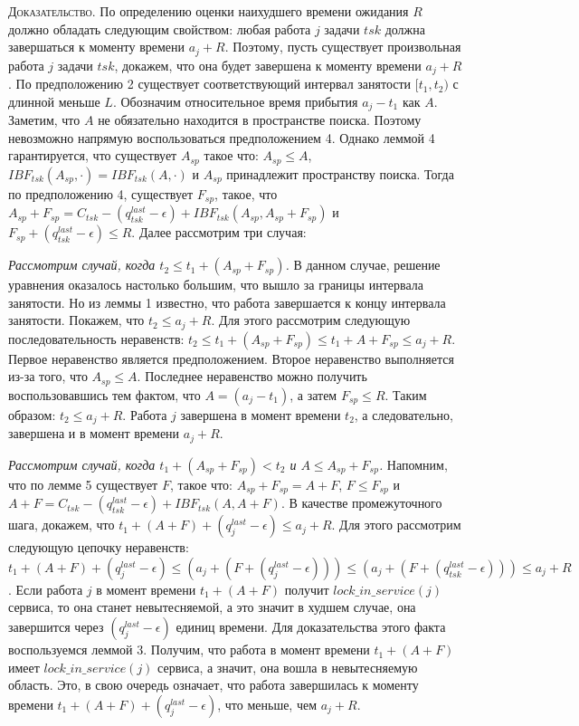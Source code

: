 \documentclass[14pt]{matmex-diploma-custom}
\begin{document}
\textsc{Доказательство.}
  По определению оценки наихудшего времени ожидания $R$ должно обладать следующим свойством:
    любая работа $j$ задачи $tsk$ должна завершаться к моменту времени $a_j + R$.
  Поэтому, пусть существует произвольная работа $j$ задачи $tsk$, докажем, 
    что она будет завершена к моменту времени $a_j + R$.
  По предположению 2 существует соответствующий интервал занятости $[t_1, t_2)$ с длинной меньше $L$.
  Обозначим относительное время прибытия $a_j - t_1$ как $A$. Заметим, что 
  $A$ не обязательно находится в пространстве поиска. Поэтому невозможно напрямую 
    воспользоваться предположением 4. Однако леммой 4 гарантируется, что
  существует $A_{sp}$ такое что: $A_{sp} \leq A$, 
  $IBF_{tsk}(A_{sp},\cdot) = IBF_{tsk}(A,\cdot)$ и $A_{sp}$ принадлежит пространству поиска. 
  Тогда по предположению 4, существует $F_{sp}$, такое, что 
    $A_{sp} + F_{sp} = C_{tsk} - (q_{tsk}^{last} - \epsilon) + IBF_{tsk}(A_{sp}, A_{sp} + F_{sp})$ и
    $F_{sp} + (q_{tsk}^{last} - \epsilon) \leq R$. Далее рассмотрим три случая:

\textit{Рассмотрим случай, когда $t_2 \leq t_1 + (A_{sp} + F_{sp})$.} 
  В данном случае, решение уравнения оказалось настолько большим, что вышло за границы 
  интервала занятости. Но из леммы 1 известно, что работа завершается к концу интервала 
  занятости. Покажем, что $t_2 \leq a_j + R$. Для этого рассмотрим следующую последовательность 
  неравенств: $t_2 \leq t_1 + (A_{sp} + F_{sp}) \leq t_1 + A + F_{sp} \leq a_{j} + R$.
  Первое неравенство является предположением. Второе неравенство выполняется из-за того, 
  что $A_{sp} \leq A$. Последнее неравенство можно получить воспользовавшись тем фактом, 
  что $A = (a_{j} - t_1)$, а затем $F_{sp} \leq R$. Таким образом: $t_2 \leq a_j + R$. 
  Работа $j$ завершена в момент времени $t_2$, а следовательно, завершена и в  момент времени $a_j + R$.

\textit{Рассмотрим случай, когда $t_1 + (A_{sp} + F_{sp}) < t_2$ и $A \leq A_{sp} + F_{sp}$.}
    Напомним, что по лемме 5 существует $F$, такое что: $A_{sp} + F_{sp} = A + F$, $F \leq F_{sp}$ и 
      $A + F = C_{tsk} - (q_{tsk}^{last} - \epsilon) + IBF_{tsk}(A, A + F)$.
    В качестве промежуточного шага, докажем, что $t_1 + (A + F) + (q_{j}^{last} - \epsilon) \leq a_{j} + R$.
    Для этого рассмотрим следующую цепочку неравенств:
    $t_1 + (A + F) + (q_{j}^{last} - \epsilon) \leq (a_j + (F + (q_{j}^{last} - \epsilon))) \leq
      (a_j + (F + (q_{tsk}^{last} - \epsilon))) \leq a_{j} + R$.
    Если работа $j$ в момент времени $t_1 + (A + F)$ получит $lock\_in\_service(j)$ сервиса, 
      то она станет невытесняемой, а это значит в худшем случае, она завершится через 
      $(q_{j}^{last} - \epsilon)$ единиц времени. 
    Для доказательства этого факта воспользуемся леммой 3. Получим, что работа 
      в момент времени $t_1 + (A + F)$ имеет $lock\_in\_service(j)$ сервиса, а значит, 
      она вошла в невытесняемую область. Это, в свою очередь означает, что работа завершилась 
      к моменту времени $t_1 + (A + F) + (q_{j}^{last} - \epsilon)$, что меньше, чем $a_j + R$.
\end{document}
